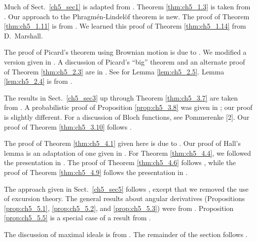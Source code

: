\notessection
{}

Much of Sect.\ \ref{ch5_sec1} is adapted from \cite{Durrett1984}. Theorem \ref{thm:ch5_1.3} is taken from \cite{RevuzYor1991}. Our approach to the Phragm\'en-Lindel\"of theorem is new. The proof of Theorem \ref{thm:ch5_1.11} is from \cite{Folland1984}. We learned this proof of Theorem \ref{thm:ch5_1.14}
from D.\ Marshall.

\mpagebreak

The proof of Picard's theorem using Brownian motion is due to \cite{Davis1975}. We modified a version given in \cite{Durrett1984}. A discussion of Picard's ``big'' theorem and an alternate proof of Theorem \ref{thm:ch5_2.3} are in \cite{Davis1979}. See \cite{Davis1973} for Lemma \ref{lem:ch5_2.5}. Lemma \ref{lem:ch5_2.4} is from \cite{Ahlfors1979}.

The results in Sect.\ \ref{ch5_sec3} up through Theorem \ref{thm:ch5_3.7} are taken from \cite{Durrett1984}. A probabilistic proof of Proposition \ref{prop:ch5_3.8} was given in \cite{Durrett1984}; our proof is slightly different. For a discussion of Bloch functions, see Pommerenke [2]. Our proof of Theorem \ref{thm:ch5_3.10} follows \cite{Banuelos1986b}.

The proof of Theorem \ref{thm:ch5_4.1} given here is due to \cite{Oksendal1983}. Our proof of Hall's lemma is an adaptation of one given in \cite{Duren1970}. For Theorem \ref{thm:ch5_4.4}, we followed the presentation in \cite{deGuzman1975}. The proof of Theorem \ref{thm:ch5_4.6} follows \cite{Makarov1985}, while the proof of Theorem \ref{thm:ch5_4.9} follows the presentation in \cite{Pommerenke1992}.

The approach given in Sect.\ \ref{ch5_sec5} follows \cite{Burdzy1987}, except that we removed the use of excursion theory. The general results about angular derivatives (Propositions \ref{prop:ch5_5.1}, \ref{prop:ch5_5.2}, and \ref{prop:ch5_5.3}) were from \cite{Pommerenke1975}. Proposition \ref{prop:ch5_5.5} is a special case of a result from \cite[][1 XII 14]{Doob1984}.

The discussion of maximal ideals is from \cite{Duren1970}. The remainder of the section follows \cite{Varopoulos1980b}.